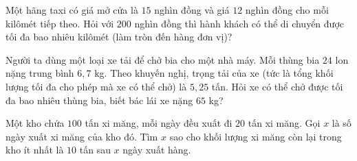 \begin{bt}
	Một hãng taxi có giá mở cửa là $15$ nghìn đồng và giá $12$ nghìn đồng cho mỗi kilômét tiếp theo. Hỏi với $200$ nghìn đồng thì hành khách có thể di chuyển được tối đa bao nhiêu kilômét (làm tròn đến hàng đơn vị)?
\end{bt}
\begin{bt}
	Người ta dùng một loại xe tải để chở bia cho một nhà máy. Mỗi thùng bia $24$ lon nặng trung bình $6{,}7$ kg. Theo khuyến nghị, trọng tải của xe (tức là tổng khối lượng tối đa cho phép mà xe có thể chở) là $5{,}25$ tấn. Hỏi xe có thể chở được tối đa bao nhiêu thùng bia, biết bác lái xe nặng $65$ kg?
\end{bt}
\begin{bt}
	Một kho chứa $100$ tấn xi măng, mỗi ngày đều xuất đi $20$ tấn xi măng. Gọi $x$ là số ngày xuất xi măng của kho đó. Tìm $x$ sao cho khối lượng xi măng còn lại trong kho ít nhất là $10$ tấn sau $x$ ngày xuất hàng.
\end{bt}
